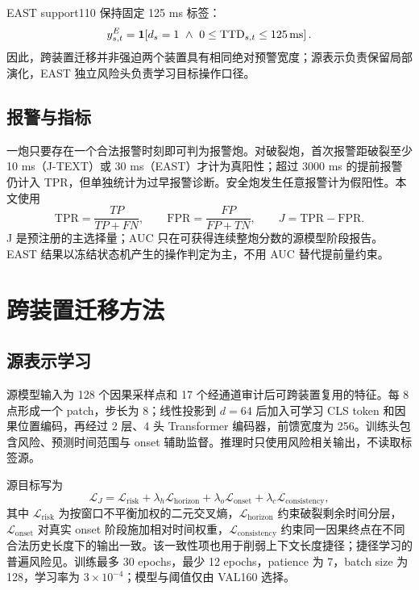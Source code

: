 EAST support110 保持固定 125 ms 标签：
\begin{equation}
y_{s,t}^E=\ind\!\left[d_s=1\ \land\ 0\leq\mathrm{TTD}_{s,t}\leq125\,\mathrm{ms}\right].
\label{eq:elabel}
\end{equation}
因此，跨装置迁移并非强迫两个装置具有相同绝对预警宽度；源表示负责保留局部演化，EAST 独立风险头负责学习目标操作口径。

\subsection{报警与指标}

一炮只要存在一个合法报警时刻即可判为报警炮。对破裂炮，首次报警距破裂至少 10 ms（J-TEXT）或 30 ms（EAST）才计为真阳性；超过 3000 ms 的提前报警仍计入 TPR，但单独统计为过早报警诊断。安全炮发生任意报警计为假阳性。本文使用
\[
\mathrm{TPR}=\frac{TP}{TP+FN},\qquad
\mathrm{FPR}=\frac{FP}{FP+TN},\qquad
J=\mathrm{TPR}-\mathrm{FPR}.
\]
J 是预注册的主选择量；AUC 只在可获得连续整炮分数的源模型阶段报告。EAST 结果以冻结状态机产生的操作判定为主，不用 AUC 替代提前量约束。

\section{跨装置迁移方法}

\subsection{源表示学习}

源模型输入为 128 个因果采样点和 17 个经通道审计后可跨装置复用的特征。每 8 点形成一个 patch，步长为 8；线性投影到 $d=64$ 后加入可学习 CLS token 和因果位置编码，再经过 2 层、4 头 Transformer 编码器，前馈宽度为 256。训练头包含风险、预测时间范围与 onset 辅助监督。推理时只使用风险相关输出，不读取标签源。

源目标写为
\begin{equation}
\mathcal L_J=\mathcal L_{\mathrm{risk}}+\lambda_h\mathcal L_{\mathrm{horizon}}
+\lambda_o\mathcal L_{\mathrm{onset}}+\lambda_c\mathcal L_{\mathrm{consistency}},
\label{eq:source-loss}
\end{equation}
其中 $\mathcal L_{\mathrm{risk}}$ 为按窗口不平衡加权的二元交叉熵，$\mathcal L_{\mathrm{horizon}}$ 约束破裂剩余时间分层，$\mathcal L_{\mathrm{onset}}$ 对真实 onset 阶段施加相对时间权重\citep{shen2024onset}，$\mathcal L_{\mathrm{consistency}}$ 约束同一因果终点在不同合法历史长度下的输出一致。该一致性项也用于削弱上下文长度捷径；捷径学习的普遍风险见\citet{geirhos2020shortcut}。训练最多 30 epochs，最少 12 epochs，patience 为 7，batch size 为 128，学习率为 $3\times10^{-4}$；模型与阈值仅由 VAL160 选择。

